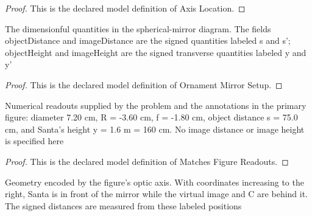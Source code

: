 \begin{proof}
  This is the declared model definition of Axis Location.
\end{proof}
\begin{definition}
  \label{def:physics:phyx-mini-0039:phyxminiproblems-problemphyxmini0039-ornamentmirrorsetup}
  The dimensionful quantities in the spherical-mirror diagram. The fields objectDistance and imageDistance are the signed quantities labeled s and s'; objectHeight and imageHeight are the signed transverse quantities labeled y and y'
\end{definition}
\begin{proof}
  This is the declared model definition of Ornament Mirror Setup.
\end{proof}
\begin{definition}
  \label{def:physics:phyx-mini-0039:phyxminiproblems-problemphyxmini0039-matchesfigurereadouts}
  Numerical readouts supplied by the problem and the annotations in the primary figure: diameter 7.20 cm, R = -3.60 cm, f = -1.80 cm, object distance s = 75.0 cm, and Santa's height y = 1.6 m = 160 cm. No image distance or image height is specified here
\end{definition}
\begin{proof}
  This is the declared model definition of Matches Figure Readouts.
\end{proof}
\begin{definition}
  \label{def:physics:phyx-mini-0039:phyxminiproblems-problemphyxmini0039-hasdepictedaxisgeometry}
  Geometry encoded by the figure's optic axis. With coordinates increasing to the right, Santa is in front of the mirror while the virtual image and C are behind it. The signed distances are measured from these labeled positions
\end{definition}
